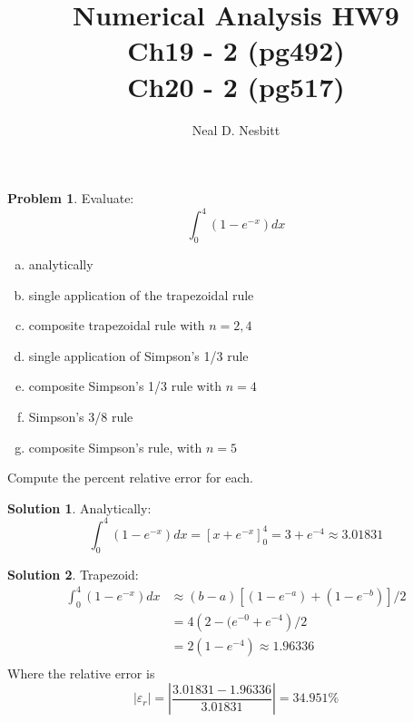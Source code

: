 \documentclass{article}
\title{Numerical Analysis HW9\\
Ch19 - 2 (pg492)\\
Ch20 - 2 (pg517)\\}
\author{Neal D. Nesbitt}
\begin{document}
\maketitle

\theoremstyle{definition}
\newtheorem{problem}{Problem}[section]
\newtheorem{solution}{Solution}[problem]
\renewcommand*{\thesolution}{\theproblem.\alph{solution}}


\setcounter{section}{19}
\setcounter{problem}{1}
\begin{problem}
Evaluate:
\[ \int_{0}^{4} \left( 1 -e^{-x} \right) dx\]
\begin{enumerate}[(a)]
\item analytically
\item single application of the trapezoidal rule
\item composite trapezoidal rule with $n=2,4$
\item single application of Simpson's 1/3 rule
\item composite Simpson's 1/3 rule with $n=4$
\item Simpson's 3/8 rule
\item composite Simpson's rule, with $n=5$
\end{enumerate}
Compute the percent relative error for each.
\end{problem}

\begin{solution}Analytically:\\
\[ \int_{0}^{4} \left( 1 -e^{-x} \right) dx = \left[ x +e^{-x} \right]_{0}^{4} = 3 +e^{-4} \approx \boxed{3.01831}\]
\end{solution}

\begin{solution}Trapezoid:\\
\begin{align*}
\int_{0}^{4} (1-e^{-x})dx &\approx (b-a)\left[ (1-e^{-a}) + (1-e^{-b}) \right]/2\\
&= 4\left( 2 -(e^{-0} +e^{-4} \right)/2\\
&= 2\left( 1 -e^{-4} \right) \approx \boxed{1.96336}\\
\end{align*}
Where the relative error is 
\[ \left|\varepsilon_{r}\right| = \left| \frac{3.01831 - 1.96336}{3.01831} \right| = \boxed{34.951\%} \]
\end{solution}
\end{document}
